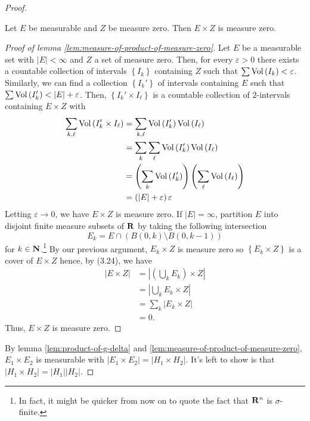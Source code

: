 \begin{proof}
\begin{lemma}
\label{lem:measure-of-product-of-measure-zero}
Let $E$ be measurable and $Z$ be measure zero. Then $E\times Z$ is measure
zero.
\end{lemma}
\begin{proof}[Proof of lemma \ref{lem:measure-of-product-of-measure-zero}]
\renewcommand\qedsymbol{$\clubsuit$}
Let $E$ be a measurable set with $\left|E\right|<\infty$ and $Z$ a set of
measure zero. Then, for every $\varepsilon>0$ there exists a countable
collection of intervals $\left\{I_k\right\}$ containing $Z$ such that
$\sum\operatorname{Vol}\left(I_k\right)<\varepsilon$. Similarly, we can find a collection
$\left\{I_k'\right\}$ of intervals containing $E$ such that
$\sum\operatorname{Vol}\left(I_k'\right)<\left|E\right|+\varepsilon$. Then,
$\left\{I_k'\times I_\ell\right\}$ is a countable collection of
$2$-intervals containing $E\times Z$ with
\begin{align*}
\sum_{k,\ell}\operatorname{Vol}\left(I_k'\times I_\ell\right)
&=\sum_{k,\ell}\operatorname{Vol}\left(I_k'\right)\operatorname{Vol}\left(I_\ell\right)\\
&=\sum_k\sum_\ell\operatorname{Vol}\left(I_k'\right)\operatorname{Vol}\left(I_\ell\right)\\
&=\left(\sum_k\operatorname{Vol}\left(I_k'\right)\right)
\left(\sum_\ell\operatorname{Vol}\left(I_\ell\right)\right)\\
&=\left(\left|E\right|+\varepsilon\right)\varepsilon
\end{align*}
Letting $\varepsilon\to 0$, we have $E\times Z$ is measure zero. If
$\left|E\right|=\infty$, partition $E$ into disjoint finite measure subsets
of $\mathbf{R}$ by taking the following intersection
\[
E_k=E\cap\left(B(0,k)\setminus B(0,k-1)\right)
\]
for $k\in\mathbf{N}$.\footnote{In fact, it might be quicker from now on to quote
  the fact that $\mathbf{R}^n$ is $\sigma$-finite.} By our previous argument,
$E_k\times Z$ is measure zero so $\left\{E_k\times Z\right\}$ is a cover of
$E\times Z$ hence, by (3.24), we have
\begin{align*}
\left|E\times Z\right|
&=\left|\left(\bigcup_k E_k\right)\times Z\right|\\
&=\left|\bigcup_k E_k\times Z\right|\\
&=\sum_k \left|E_k\times Z\right|\\
&=0.
\end{align*}
Thus, $E\times Z$ is measure zero.
\end{proof}

By lemma \ref{lem:product-of-g-delta} and
\ref{lem:measure-of-product-of-measure-zero}, $E_1\times E_2$ is measurable
with $\left|E_1\times E_2\right|=\left|H_1\times H_2\right|$. It's left to
show is that $\left|H_1\times H_2\right|=\left|H_1\right|\left|H_2\right|$.


\end{proof}
